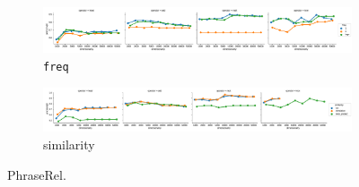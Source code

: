 \begin{figure}[t]
  \centering

  \begin{subfigure}[t]{\textwidth}
    \includegraphics[width=1.1\textwidth]{supplement/figures/phraserel-interaction-freq}

  \caption{\texttt{freq}}
  \label{fig:phraserel-freq}
  \end{subfigure}

  \begin{subfigure}[t]{\textwidth}
    \includegraphics[width=1.1\textwidth]{supplement/figures/phraserel-interaction-similarity}

  \caption{similarity}
  \label{fig:phraserel-similarity}
  \end{subfigure}

  \caption{PhraseRel.}
\end{figure}
